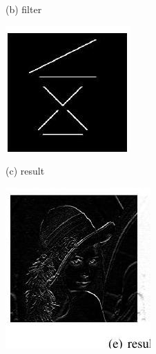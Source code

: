 \documentclass[10pt]{article}
\begin{document}
(b) filter

\includegraphics[max width=\textwidth]{2022_01_06_b5ce182ed1bd5f482e5bg-17(4)}

(c) result

\includegraphics[max width=\textwidth]{2022_01_06_b5ce182ed1bd5f482e5bg-17(5)}
\end{document}
